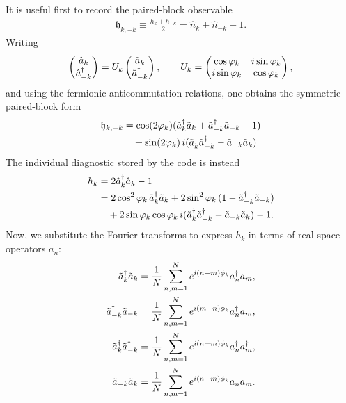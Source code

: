 \documentclass[aps,prx,twocolumn,superscriptaddress,nofootinbib,nolongbibliography,nobalancelastpage,10pt,floatfix]{revtex4-2}
\begin{document}
It is useful first to record the paired-block observable
\begin{align}
    \mathfrak h_{k,-k}\equiv \frac{h_k+h_{-k}}{2}
    =\hat n_k+\hat n_{-k}-1.
\end{align}
Writing
\begin{align}
    \begin{pmatrix}
        \hat{a}_k\\
        \hat{a}_{-k}^\dag
    \end{pmatrix}
    = U_k
    \begin{pmatrix}
        \tilde{a}_k\\
        \tilde{a}_{-k}^\dag
    \end{pmatrix},
    \qquad
    U_k =
    \begin{pmatrix}
        \cos\varphi_k  & i\sin\varphi_k\\
        i\sin\varphi_k & \cos\varphi_k
    \end{pmatrix},
\end{align}
and using the fermionic anticommutation relations, one obtains the symmetric paired-block form
\begin{align}
    \mathfrak h_{k,-k}
    &= \cos(2\varphi_k)(\tilde{a}_k^\dag\tilde{a}_k + \tilde{a}_{-k}^\dag\tilde{a}_{-k} - 1)\nonumber\\
    &\quad
      + \sin(2\varphi_k)\,
        i(\tilde{a}_k^\dag\tilde{a}_{-k}^\dag - \tilde{a}_{-k}\tilde{a}_k).
    \label{eq:hk_bogo_symmetric}
\end{align}
The individual diagnostic stored by the code is instead
\begin{align}
    h_k
    &=2\hat a_k^\dag\hat a_k-1\nonumber\\
    &=2\cos^2\varphi_k\,\tilde{a}_k^\dag\tilde{a}_k
      +2\sin^2\varphi_k\,(1-\tilde{a}_{-k}^\dag\tilde{a}_{-k})\nonumber\\
    &\quad
      +2\sin\varphi_k\cos\varphi_k\,
       i(\tilde{a}_k^\dag\tilde{a}_{-k}^\dag-\tilde{a}_{-k}\tilde{a}_k)-1.
    \label{eq:hk_individual_momentum}
\end{align}
Now, we substitute the Fourier transforms to express $h_k$ in terms of real-space operators $a_n$:
\begin{align}
    \tilde{a}_k^\dag \tilde{a}_k         &= \frac{1}{N} \sum_{n,m=1}^N e^{i (n-m)\phi_k} a_n^\dag a_m,\\
    \tilde{a}_{-k}^\dag \tilde{a}_{-k}   &= \frac{1}{N} \sum_{n,m=1}^N e^{i (m-n)\phi_k} a_n^\dag a_m,\\
    \tilde{a}_k^\dag \tilde{a}_{-k}^\dag &= \frac{1}{N} \sum_{n,m=1}^N e^{i (n-m)\phi_k} a_n^\dag a_m^\dag,\\
    \tilde{a}_{-k} \tilde{a}_k           &= \frac{1}{N} \sum_{n,m=1}^N e^{i (n-m)\phi_k} a_n a_m.
\end{align}
\end{document}

